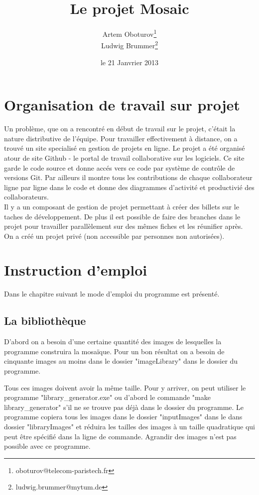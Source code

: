 \documentclass[a4paper]{article}
\begin{document}
\listoftodos

\title{Le projet Mosaic}
\author{
  Artem Oboturov\thanks{oboturov@telecom-paristech.fr}
  \\Ludwig Brummer\thanks{ludwig.brummer@mytum.de}
}
\date{le 21 Janvrier 2013}
\maketitle

\section{Organisation de travail sur projet}
Un probl\`eme, que on a rencontr\'e en d\'ebut de travail sur le projet, c'\'etait la nature distributive de l'\'equipe.
Pour travailler effectivement \`a distance, on a trouv\'e un site specialis\'e en gestion de projets en ligne.
Le projet a \'et\'e organis\'e atour de site Github - le portal de travail collaborative sur les logiciels.
Ce site garde le code source et donne acc\'es vers ce code par syst\`eme de contr\^ole de versions Git. Par ailleurs il montre tous les contributions de chaque collaborateur ligne par ligne dans le code et donne des diagrammes d'activit\'e et productivi\'e des collaborateurs.\\
Il y a un composant de gestion de projet permettant \`a cr\'eer des billets sur le taches de d\'eveloppement.
De plus il est possible de faire des branches dans le projet pour travailler parallèlement sur des m\^emes fiches et les r\'eunifier apr\`es.\\
On a cr\'e\'e un projet priv\'e (non accessible par personnes non autoris\'ees).
\section{Instruction d'emploi}
Dans le chapitre suivant le mode d'emploi du programme est pr\'esent\'e.
\subsection{La biblioth\`eque}
D'abord on a besoin d'une certaine quantit\'e des images de lesquelles la programme construira la mosa\"{i}que.
 Pour un bon r\'esultat on a besoin de cinquante images au moins dans le dossier "imageLibrary" dans le dossier du programme.

Tous ces images doivent avoir la m\^eme taille.
Pour y arriver, on peut utiliser le programme "library\_generator.exe" ou d'abord le commande "make library\_generator" s'il ne se trouve pas d\'ej\`a dans le dossier du programme.
 Le programme copiera tous les images dans le dossier "inputImages" dans le dans dossier "libraryImages" et r\'eduira les tailles des images \`a un taille quadratique qui peut \^etre sp\'ecifi\'e dans la ligne de commande.
 Agrandir des images n'est pas possible avec ce programme.
 
\end{document}
